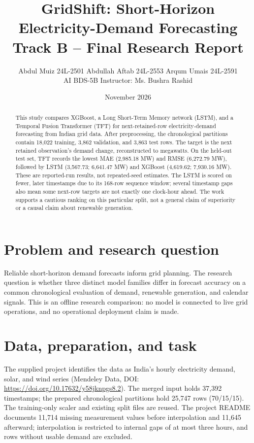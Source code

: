 \documentclass[12pt,a4paper]{article}
\title{\textbf{GridShift: Short-Horizon Electricity-Demand Forecasting}\\Track B -- Final Research Report}
\author{Abdul Muiz 24L-2501 \textbar{} Abdullah Aftab 24L-2553 \textbar{} Arqum Umais 24L-2591\\AI BDS-5B \textbar{} Instructor: Ms. Bushra Rashid}
\date{November 2026}
\begin{document}
\maketitle
\begin{abstract}
This study compares XGBoost, a Long Short-Term Memory network (LSTM), and a Temporal Fusion Transformer (TFT) for next-retained-row electricity-demand forecasting from Indian grid data. After preprocessing, the chronological partitions contain 18,022 training, 3,862 validation, and 3,863 test rows. The target is the next retained observation's demand change, reconstructed to megawatts. On the held-out test set, TFT records the lowest MAE (2,985.18 MW) and RMSE (6,272.79 MW), followed by LSTM (3,567.73; 6,641.47 MW) and XGBoost (4,619.62; 7,930.16 MW). These are reported-run results, not repeated-seed estimates. The LSTM is scored on fewer, later timestamps due to its 168-row sequence window; several timestamp gaps also mean some next-row targets are not exactly one clock-hour ahead. The work supports a cautious ranking on this particular split, not a general claim of superiority or a causal claim about renewable generation.
\end{abstract}
\tableofcontents\newpage
\section{Problem and research question}
Reliable short-horizon demand forecasts inform grid planning. The research question is whether three distinct model families differ in forecast accuracy on a common chronological evaluation of demand, renewable generation, and calendar signals. This is an offline research comparison: no model is connected to live grid operations, and no operational deployment claim is made.
\section{Data, preparation, and task}
The supplied project identifies the data as India's hourly electricity demand, solar, and wind series (Mendeley Data, DOI: \url{https://doi.org/10.17632/y58jknpgs8.2}). The merged input holds 37,392 timestamps; the prepared chronological partitions hold 25,747 rows (70/15/15). The training-only scaler and existing split files are reused. The project README documents 11,714 missing measurement values before interpolation and 11,645 afterward; interpolation is restricted to internal gaps of at most three hours, and rows without usable demand are excluded.
\end{document}

